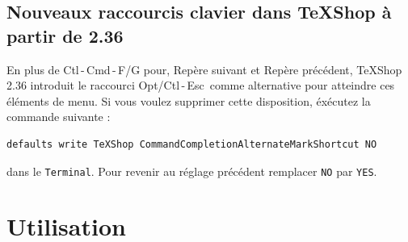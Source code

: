 \documentclass[11pt,french]{article}
\newcommand{\optkey}{\textsf{Opt}}
\newcommand{\ctlkey}{\textsf{Ctl}}
\newcommand{\cmdkey}{\textsf{Cmd}}
\newcommand{\esckey}{\textsf{Esc}}
\newcommand{\mnu}[1]{\textsf{#1}}
\newcommand{\selmark}{\colorbox{green}{\rule[-0.5ex]{0ex}{2.1ex}\texttt{•}}}
\newcommand{\TS}{\textsf{\TeX Shop}}
\newcommand{\CCT}{\textsf{CommandCompletion.txt}}
\begin{document}

\subsection*{Nouveaux raccourcis clavier dans \TS{} à partir de 2.36}

En plus de \ctlkey\,-\,\cmdkey\,-\,\textsf{F/G} pour, \mnu{Repère suivant} et \mnu{Repère précédent}, \TS{} 2.36 introduit le raccourci \optkey/\ctlkey\,-\,\esckey\ comme alternative pour atteindre ces éléments de menu. Si vous voulez supprimer cette disposition, éxécutez la commande suivante :
\begin{verbatim}
defaults write TeXShop CommandCompletionAlternateMarkShortcut NO
\end{verbatim}
dans le \texttt{Terminal}. Pour revenir au réglage précédent remplacer \texttt{NO} par \texttt{YES}.  


\section*{Utilisation}
\end{document}
